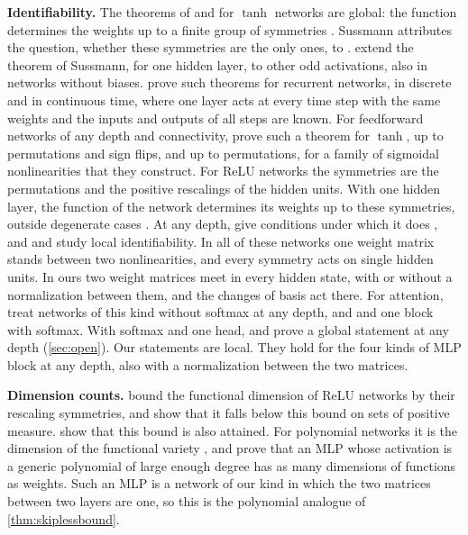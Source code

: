 \documentclass[10pt]{article}
\theoremstyle{definition}
\theoremstyle{remark}
\newcommand{\para}[1]{\smallskip\noindent\textbf{#1}\hspace{0.5em}}
\begin{document}
\para{Identifiability.} The theorems of \citet{sussmann1992} and \citet{fefferman1994} for $\tanh$ networks are global: the function determines the weights up to a finite group of symmetries \citep[see also][]{chen1993geometry,kurkova1994functionally}. Sussmann attributes the question, whether these symmetries are the only ones, to \citet{hechtnielsen1989theory}. \citet{albertini1993uniqueness} extend the theorem of Sussmann, for one hidden layer, to other odd activations, also in networks without biases. \citet{albertini1993discrete,albertini1993form} prove such theorems for recurrent networks, in discrete and in continuous time, where one layer acts at every time step with the same weights and the inputs and outputs of all steps are known. For feedforward networks of any depth and connectivity, \citet{vlacic2020affine} prove such a theorem for $\tanh$, up to permutations and sign flips, and \citet{vlacic2019identifiability} up to permutations, for a family of sigmoidal nonlinearities that they construct. For ReLU networks the symmetries are the permutations and the positive rescalings of the hidden units. With one hidden layer, the function of the network determines its weights up to these symmetries, outside degenerate cases \citep{petzka2020symmetries,stock2021embedding}. At any depth, \citet{bonapellissier2023parameter} give conditions under which it does \citep[see also][]{buithimai2020functional,rolnick2020reverse}, and \citet{stock2021embedding} and \citet{bonapellissier2022local} study local identifiability. In all of these networks one weight matrix stands between two nonlinearities, and every symmetry acts on single hidden units. In ours two weight matrices meet in every hidden state, with or without a normalization between them, and the changes of basis act there. For attention, \citet{henry2025lightning} treat networks of this kind without softmax at any depth, and \citet{tran2025equivariant} and \citet{henry2026generic} one block with softmax. With softmax and one head, \citet{amarel2026identifiability} and \citet{konda2026identifiability} prove a global statement at any depth (\cref{sec:open}). Our statements are local. They hold for the four kinds of MLP block at any depth, also with a normalization between the two matrices.

\para{Dimension counts.} \citet{grigsby2022functional} bound the functional dimension of ReLU networks by their rescaling symmetries, and \citet{grigsby2023hidden} show that it falls below this bound on sets of positive measure. \citet{grillo2026most} show that this bound is also attained. For polynomial networks it is the dimension of the functional variety \citep{kileel2019expressive}, and \citet[Theorem~4.1]{shahverdi2026razor} prove that an MLP whose activation is a generic polynomial of large enough degree has as many dimensions of functions as weights. Such an MLP is a network of our kind in which the two matrices between two layers are one, so this is the polynomial analogue of \cref{thm:skiplessbound}.
\end{document}
